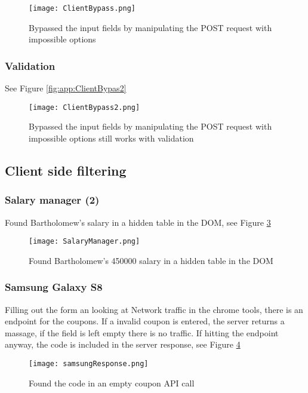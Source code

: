 \documentclass[
	letterpaper, %
	10pt, %
	unnumberedsections, %
	twoside, %
]{APAAssignment}
\begin{document}
\begin{appendices}
\begin{figure}[!htp] %
	\centering
	\texttt{[image: ClientBypass.png]}
	\caption{Bypassed the input fields by manipulating the POST request with impossible options}
	\label{fig:app:ClientBypass}
\end{figure}

\subsubsection{Validation}
See Figure \ref{fig:app:ClientBypas2}

\begin{figure}[!htp] %
	\centering
	\texttt{[image: ClientBypass2.png]}
	\caption{Bypassed the input fields by manipulating the POST request with impossible options still works with validation}
	\label{fig:app:ClientBypass2}
\end{figure}

\subsection{Client side filtering}
\subsubsection{Salary manager (2)}
Found Bartholomew's salary in a hidden table in the DOM, see Figure \ref{fig:app:SalaryManager}

\begin{figure}[!htp] %
	\centering
	\texttt{[image: SalaryManager.png]}
	\caption{Found Bartholomew's 450000 salary in a hidden table in the DOM}
	\label{fig:app:SalaryManager}
\end{figure}

\subsubsection{Samsung Galaxy S8}
Filling out the form an looking at Network traffic in the chrome tools, there is an endpoint for the coupons. If a invalid coupon is entered, the server returns a massage, if the field is left empty there is no traffic. If hitting the endpoint anyway, the code is included in the server response, see Figure \ref{fig:app:samsungResponse}

\begin{figure}[!htp] %
	\centering
	\texttt{[image: samsungResponse.png]}
	\caption{Found the code in an empty coupon API call}
	\label{fig:app:samsungResponse}
\end{figure}



\end{appendices}
\end{document}
